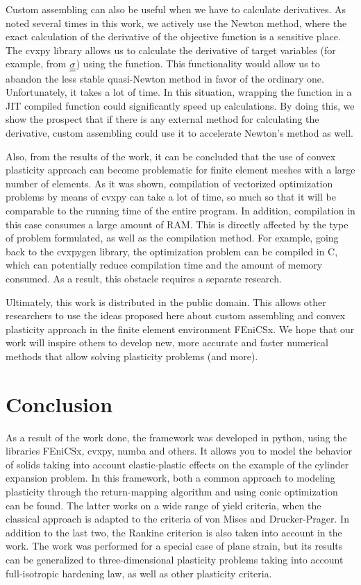 \documentclass[12pt]{article}
\begin{document}
Custom assembling can also be useful when we have to calculate derivatives. As noted several times in this work, we actively use the Newton method, where the exact calculation of the derivative of the objective function is a sensitive place. The cvxpy library allows us to calculate the derivative of target variables (for example, from $\underline{\underline{\sigma}}$) using the  function. This functionality would allow us to abandon the less stable quasi-Newton method in favor of the ordinary one. Unfortunately, it takes a lot of time. In this situation, wrapping the  function in a JIT compiled function could significantly speed up calculations. By doing this, we show the prospect that if there is any external method for calculating the derivative, custom assembling could use it to accelerate Newton's method as well. 

Also, from the results of the work, it can be concluded that the use of convex plasticity approach can become problematic for finite element meshes with a large number of elements. As it was shown, compilation of vectorized optimization problems by means of cvxpy can take a lot of time, so much so that it will be comparable to the running time of the entire program. In addition, compilation in this case consumes a large amount of RAM. This is directly affected by the type of problem formulated, as well as the compilation method. For example, going back to the cvxpygen library, the optimization problem can be compiled in C, which can potentially reduce compilation time and the amount of memory consumed. As a result, this obstacle requires a separate research.

Ultimately, this work is distributed in the public domain. This allows other researchers to use the ideas proposed here about custom assembling and convex plasticity approach in the finite element environment FEniCSx. We hope that our work will inspire others to develop new, more accurate and faster numerical methods that allow solving plasticity problems (and more).

\newpage
{}
{}
\section*{Conclusion}
\label{sec:conclusion}

As a result of the work done, the framework was developed in python, using the libraries FEniCSx, cvxpy, numba and others. It allows you to model the behavior of solids taking into account elastic-plastic effects on the example of the cylinder expansion problem. In this framework, both a common approach to modeling plasticity through the return-mapping algorithm and using conic optimization can be found. The latter works on a wide range of yield criteria, when the classical approach is adapted to the criteria of von Mises and Drucker-Prager. In addition to the last two, the Rankine criterion is also taken into account in the work. The work was performed for a special case of plane strain, but its results can be generalized to three-dimensional plasticity problems taking into account full-isotropic hardening law, as well as other plasticity criteria.
\end{document}
